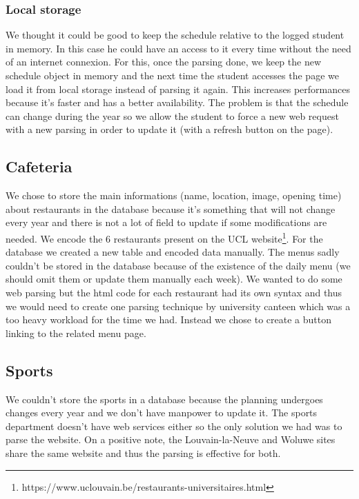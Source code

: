 \documentclass{eplmastersthesis}
\begin{document}
\subsubsection{Local storage}
We thought it could be good to keep the schedule relative to the logged student in memory. In this case he could have an access to it every time without the need of an internet connexion. For this, once the parsing done, we keep the new schedule object in memory and the next time the student accesses the page we load it from local storage instead of parsing it again. This increases performances because it's faster and has a better availability. The problem is that the schedule can change during the year so we allow the student to force a new web request with a new parsing in order to update it (with a refresh button on the page).

\subsection{Cafeteria}
We chose to store the main informations (name, location, image, opening time) about restaurants in the database because it's  something that will not change every year and there is not a lot of field to update if some modifications are needed. We encode the 6 restaurants present on the UCL website\footnote{https://www.uclouvain.be/restaurants-universitaires.html}. For the database we created a new table and encoded data manually. The menus sadly couldn't be stored in the database because of the existence of the daily menu (we should omit them or update them manually each week). We wanted to do some web parsing but the html code for each restaurant had its own syntax and thus we would need to create one parsing technique by university canteen which was a too heavy workload for the time we had. Instead we chose to create a button linking to the related menu page.
\subsection{Sports}
We couldn't store the sports in a database because the planning undergoes changes every year and we don't have manpower to update it. The sports department doesn't have web services either so the only solution we had was to parse the website. On a positive note, the Louvain-la-Neuve and Woluwe sites share the same website and thus the parsing is effective for both. 
\end{document}
